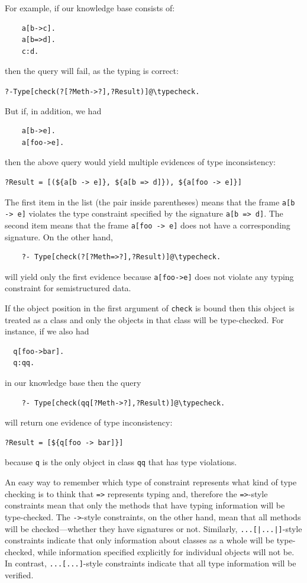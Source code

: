 \documentclass[11pt]{article}
\newcommand{\bs}{\textbackslash}
\begin{document}
For example, if our knowledge base consists of:
\begin{verbatim}
    a[b->c].
    a[b=>d].
    c:d.
\end{verbatim}
then the query will fail, as the typing is correct:
\begin{alltt}
    ?- Type[check(?[?Meth->?],?Result)]@\bs{}typecheck.
\end{alltt}
But if, in addition, we had
\begin{verbatim}
    a[b->e].
    a[foo->e].
\end{verbatim}
then the above query would yield multiple evidences of type inconsistency:
\begin{verbatim}
?Result = [(${a[b -> e]}, ${a[b => d]}), ${a[foo -> e]}]
\end{verbatim}
The first item in the list (the pair inside parentheses)
means that the frame {\tt a[b -> e]} violates the type constraint
specified by the signature {\tt a[b => d]}. The second item means that the
frame {\tt a[foo -> e]} does not have a corresponding signature.
On the other hand,
\begin{verbatim}
    ?- Type[check(?[?Meth=>?],?Result)]@\typecheck.
\end{verbatim}
will yield only the first evidence because {\tt a[foo->e]} does not violate
any typing constraint for semistructured data.

If the object position in the first argument of {\tt check} is bound
then this object is treated as a class and only the objects in that class
will be type-checked. For instance, if we also had
\begin{verbatim}
  q[foo->bar].
  q:qq.
\end{verbatim}
in our knowledge base then the query
\begin{verbatim}
    ?- Type[check(qq[?Meth->?],?Result)]@\typecheck.
\end{verbatim}
will return one evidence of type inconsistency:
\begin{verbatim}
?Result = [${q[foo -> bar]}]
\end{verbatim}
because {\tt q} is the only object in class {\tt qq} that has type
violations.  

An easy way to remember which type of constraint represents what kind of type
checking is to think that {\tt =>}  represents typing and, therefore the
{\tt =>}-style constraints mean that only the methods that have typing
information will be type-checked. The {\tt ->}-style constraints, on the other
hand, mean that all methods will be checked---whether they have signatures
or not. Similarly, \texttt{...[|...|]}-style  constraints indicate that
only information about classes as a whole will be type-checked, while
information specified explicitly for individual objects will not be.
In contrast, \texttt{...[...]}-style constraints indicate that all type
information will be verified.
\end{document}

